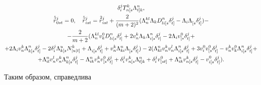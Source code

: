 \begin{gather}
\delta^j_i T^k_{n[s}\Lambda^n_{t]k}, \\


%


\up{\,5}{r}^j_{0s t}=0,\quad \up{\,5}{r}^j_{is t}= 


\up{\,2}{r}^j_{is t}+\frac{2}{(m+2)^2}(\Lambda^{k l}_n\Lambda_k 


D^{n\pj}_{l i[s}\delta^j_{t]}-


\Lambda_i\Lambda^\pj_{[s}\delta^j_{t]})- \notag \\


%


-\frac{2}{m+2}(\Lambda^{k l}_n v^0_k D^{n\pj}_{l i[s}\delta^j_{t]}+ 


2v^k_n\Lambda_k\Lambda^{n\pj}_{i[s}\delta^j_{t]}- 


2\Lambda_i v^0_{[s}\delta^j_{t]}+ \notag \\ 


% 


+2\Lambda_i v^k_n\Lambda^{n\pj}_{k[s}\delta^j_{t]}- 


2\delta^j_i\Lambda^u_{k[s}N^k_{|u|t]}+\Lambda^\pj_{i[s}\delta^j_{t]}+ 


v_n^k\Lambda^n_{k i}\Lambda^\pj_{[s}\delta^j_{t]})- 


2(\Lambda^n_{k l}v^k_n v^l_n\Lambda^{n\pj}_{i[s}\delta^j_{t]}+ 


3v^0_i v^0_{[s}\delta^j_{t]}-v^k_n v^0_k\Lambda^{n\pj}_{i[s} 


\delta^j_{t]}+ \notag \\ 


% 


+\Lambda^n_{i l}v^l_n v^k_n\Lambda^{n\pj}_{k[s}\delta^j_{t]}- 


\Lambda^n_{i k}v^k_nv^0_{[s}\delta^j_{t]}+\delta^j_i 


v^k_{n[s}\Lambda^n_{t]k}+\delta^j_i v^0_{[s t]}+ 


\Lambda^n_{i k}v^k_{n[s}\delta^j_{t]}-v^{0\pj}_{i[s}\delta^j_{t]}). 


\end{gather} 


 


Таким образом, справедлива 


 


